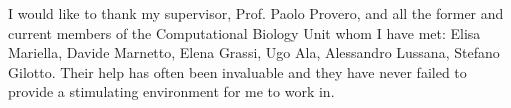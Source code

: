 \documentclass[a4paper,twoside,notoc,marginals=justified,nobib]{tufte-book}
\begin{document}
\cleardoublepage
\null{}
\begin{doublespace}
\noindent\fontsize{15}{15}\selectfont\itshape
\nohyphenation



\noindent\fontsize{15}{15}\selectfont\itshape

I would like to thank my supervisor, Prof. Paolo Provero, and all the 
former and current members of the Computational Biology Unit whom I have 
met: Elisa Mariella, Davide Marnetto, Elena Grassi, Ugo Ala, Alessandro 
Lussana, Stefano Gilotto. Their help has often been invaluable and they 
have never failed to provide a stimulating environment for me to work 
in.

\end{doublespace}
\null


\cleardoublepage





\mainmatter















\backmatter


\printbibheading[heading=bibintoc,title=References]
\printbibliography[heading=subbibliography,keyword=TWAS,title=Main 
Articles]
\printbibliography[heading=subbibliography,notkeyword=TWAS,title=Further 
Reading]
\nocite{*}




\end{document}
